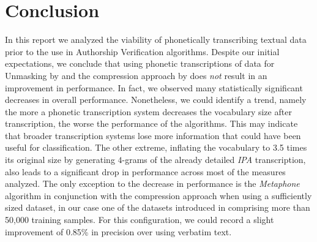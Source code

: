 \chapter{Conclusion}\label{conclusion}
In this report we analyzed the viability of phonetically transcribing textual data prior to the use in Authorship Verification algorithms.
Despite our initial expectations, we conclude that using phonetic transcriptions of data for Unmasking by \cite{koppel2004unmasking} and the compression approach by \cite{teahan2003compression} does \textit{not} result in an improvement in performance.
In fact, we observed many statistically significant decreases in overall performance.
Nonetheless, we could identify a trend, namely the more a phonetic transcription system decreases the vocabulary size after transcription, the worse the performance of the algorithms.
This may indicate that broader transcription systems lose more information that could have been useful for classification.
The other extreme, inflating the vocabulary to 3.5 times its original size by generating $4$-grams of the already detailed \textit{IPA} transcription, also leads to a significant drop in performance across most of the measures analyzed.
The only exception to the decrease in performance is the \textit{Metaphone} algorithm in conjunction with the compression approach when using a sufficiently sized dataset, in our case one of the datasets introduced in \cite{bevendorff2020overview} comprising more than 50,000 training samples.
For this configuration, we could record a slight improvement of 0.85\% in precision over using verbatim text.

